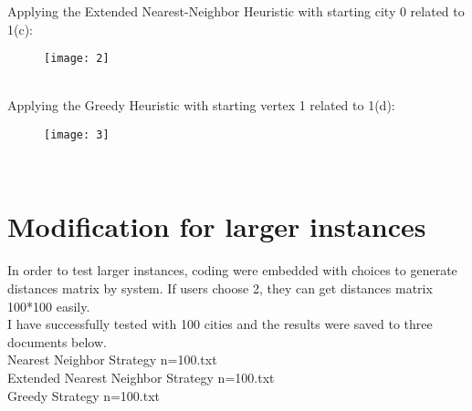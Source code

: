 \documentclass[12pt, letterpaper]{article}
\begin{document}
Applying the Extended Nearest-Neighbor Heuristic with starting
city 0 related to 1(c):
\begin{figure}[H]
	\centering
	\texttt{[image: 2]}
	\caption{}
	\label{fig:2}
\end{figure}
~\\
Applying the Greedy Heuristic with starting vertex 1
related to 1(d):
\begin{figure}[H]
	\centering
	\texttt{[image: 3]}
	\caption{}
	\label{fig:3}
\end{figure}

~\\
\section{Modification for larger instances}

In order to test larger instances, coding were embedded with choices to generate distances matrix by system. If users choose 2, they can get distances matrix 100*100 easily.\\

I have successfully tested with 100 cities and the results were saved to three documents below.\\
Nearest Neighbor Strategy n=100.txt\\
Extended Nearest Neighbor Strategy n=100.txt\\
Greedy Strategy n=100.txt\\
\end{document}
